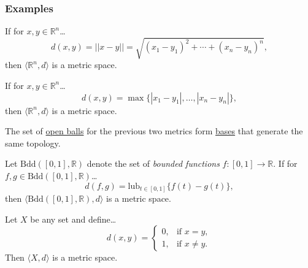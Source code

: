 \subsubsection{Examples}\label{metricexamples}

\label{euclideanmetric}

If for $x,y \in \mathbb{R}^n$\dots
$$d(x,y) = ||x-y|| = \sqrt{(x_1 - y_1)^2 + \cdots + (x_n - y_n)^n},$$
then $\langle \mathbb{R}^n,d \rangle$ is a metric space.

\label{euclideanmetric}

If for $x,y \in \mathbb{R}^n$\dots
$$d(x,y) = \max\{|x_1 - y_1|, \dots, |x_n - y_n|\},$$
then $\langle \mathbb{R}^n,d \rangle$ is a metric space.\newline

\noindent The set of \hyperref[metricopenball]{open balls} for the previous two metrics form \hyperref[basis]{bases} that generate the same topology.

\label{bddmetric}

Let $\textrm{Bdd}([0,1],\mathbb{R})$ denote the set of \emph{bounded functions} $f : [0,1] \rightarrow \mathbb{R}$. If for $f,g \in \textrm{Bdd}([0,1],\mathbb{R})$\dots
$$d(f,g) = \textrm{lub}_{t \in [0,1]}\{f(t) - g(t)\},$$
then $\langle \textrm{Bdd}([0,1],\mathbb{R}),d \rangle$ is a metric space.

\label{discretemetric}

Let $X$ be any set and define\dots
\[
	d(x,y) = \begin{cases}
				0, & \textrm{if } x = y,\\
				1, & \textrm{if } x \neq y.
			 \end{cases}
\]
Then $\langle X,d \rangle$ is a metric space.